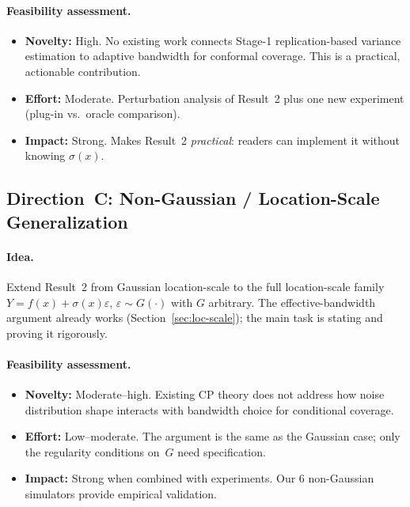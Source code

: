 \documentclass[11pt]{article}
\begin{document}
\paragraph{Feasibility assessment.}
\begin{itemize}
  \item \textbf{Novelty:} High. No existing work connects Stage-1
    replication-based variance estimation to adaptive bandwidth for
    conformal coverage. This is a practical, actionable contribution.
  \item \textbf{Effort:} Moderate. Perturbation analysis of Result~2
    plus one new experiment (plug-in vs.\ oracle comparison).
  \item \textbf{Impact:} Strong. Makes Result~2 \emph{practical}:
    readers can implement it without knowing $\sigma(x)$.
\end{itemize}

\subsection{Direction~C: Non-Gaussian / Location-Scale Generalization}

\paragraph{Idea.}
Extend Result~2 from Gaussian location-scale to the full location-scale
family $Y = f(x) + \sigma(x)\varepsilon$, $\varepsilon \sim G(\cdot)$
with $G$ arbitrary. The effective-bandwidth argument already works
(Section~\ref{sec:loc-scale}); the main task is stating and proving
it rigorously.

\paragraph{Feasibility assessment.}
\begin{itemize}
  \item \textbf{Novelty:} Moderate--high. Existing CP theory does not
    address how noise distribution shape interacts with bandwidth
    choice for conditional coverage.
  \item \textbf{Effort:} Low--moderate. The argument is the same as
    the Gaussian case; only the regularity conditions on~$G$ need
    specification.
  \item \textbf{Impact:} Strong when combined with experiments.
    Our 6 non-Gaussian simulators provide empirical validation.
\end{itemize}
\end{document}
